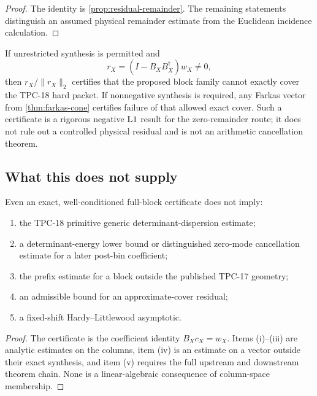 \begin{proof}
The identity is \cref{prop:residual-remainder}.  The remaining
statements distinguish an assumed physical remainder estimate from
the Euclidean incidence calculation.
\end{proof}

\begin{corollary}
\label{cor:tpc18-failure-certificate}
If unrestricted synthesis is permitted and
\[
 r_X=(I-B_XB_X^\dagger)w_X\ne0,
\]
then \(r_X/\|r_X\|_2\) certifies that the proposed block family cannot
exactly cover the TPC-18 hard packet.  If nonnegative synthesis is required,
any Farkas vector from \cref{thm:farkas-cone} certifies failure of that
allowed exact cover.  Such a certificate is a rigorous negative
\(\mathrm{L1}\) result for the zero-remainder route; it does not rule out a
controlled physical residual and is not an arithmetic cancellation
theorem.
\end{corollary}

\subsection{What this does not supply}

\begin{proposition}
\label{prop:independent-downstream-inputs}
Even an exact, well-conditioned full-block certificate does not imply:
\begin{enumerate}[label=(\roman*),leftmargin=2.2em]
\item the TPC-18 primitive generic determinant-dispersion estimate;
\item a determinant-energy lower bound or distinguished zero-mode
  cancellation estimate for a later post-bin coefficient;
\item the prefix estimate for a block outside the published TPC-17
  geometry;
\item an admissible bound for an approximate-cover residual;
\item a fixed-shift Hardy--Littlewood asymptotic.
\end{enumerate}
\end{proposition}

\begin{proof}
The certificate is the coefficient identity \(B_Xc_X=w_X\).
Items (i)--(iii) are analytic estimates on the columns, item (iv) is
an estimate on a vector outside their exact synthesis, and item (v)
requires the full upstream and downstream theorem chain.  None is a
linear-algebraic consequence of column-space membership.
\end{proof}

